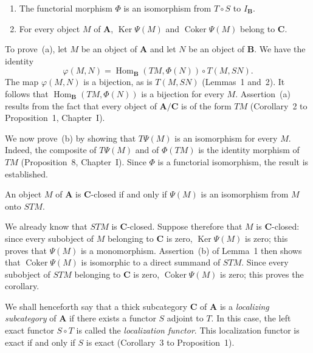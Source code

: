 \begin{proposition}
\begin{enumerate}
\item[a.] The functorial morphism $\Phi$ is an isomorphism from
      $T\circ S$ to $I_{\mathbf B}$.
\item[b.] For every object $M$ of $\mathbf A$, $\operatorname{Ker}\Psi(M)$
      and $\operatorname{Coker}\Psi(M)$ belong to $\mathbf C$.
\end{enumerate}
\end{proposition}

To prove~(a), let $M$ be an object of $\mathbf A$ and let $N$ be an object
of $\mathbf B$. We have the identity
\[
  \varphi(M,N)=\operatorname{Hom}_{\mathbf B}(TM,\Phi(N))\circ
  T(M,SN).
\]
The map $\varphi(M,N)$ is a bijection, as is $T(M,SN)$ (Lemmas~1 and~2).
It follows that
$\operatorname{Hom}_{\mathbf B}(TM,\Phi(N))$ is a bijection for every $M$.
Assertion~(a) results from the fact that every object of $\mathbf A/\mathbf C$
is of the form $TM$ (Corollary~2 to Proposition~1, Chapter~I).

We now prove~(b) by showing that $T\Psi(M)$ is an isomorphism for every
$M$. Indeed, the composite of $T\Psi(M)$ and of $\Phi(TM)$ is the identity
morphism of $TM$ (Proposition~8, Chapter~I). Since $\Phi$ is a functorial
isomorphism, the result is established.

\begin{unnumberedcorollary}
An object $M$ of $\mathbf A$ is $\mathbf C$-closed if and only if
$\Psi(M)$ is an isomorphism from $M$ onto $STM$.
\end{unnumberedcorollary}

We already know that $STM$ is $\mathbf C$-closed. Suppose therefore that
$M$ is $\mathbf C$-closed: since every subobject of $M$ belonging to
$\mathbf C$ is zero, $\operatorname{Ker}\Psi(M)$ is zero; this proves that
$\Psi(M)$ is a monomorphism. Assertion~(b) of Lemma~1 then shows that
$\operatorname{Coker}\Psi(M)$ is isomorphic to a direct summand of $STM$.
Since every subobject of $STM$ belonging to $\mathbf C$ is zero,
$\operatorname{Coker}\Psi(M)$ is zero; this proves the corollary.

We shall henceforth say that a thick subcategory $\mathbf C$ of
$\mathbf A$ is a \emph{localizing subcategory} of $\mathbf A$ if there
exists a functor $S$ adjoint to $T$. In this case, the left exact functor
$S\circ T$ is called the \emph{localization functor}. This localization
functor is exact if and only if $S$ is exact (Corollary~3 to
Proposition~1).

